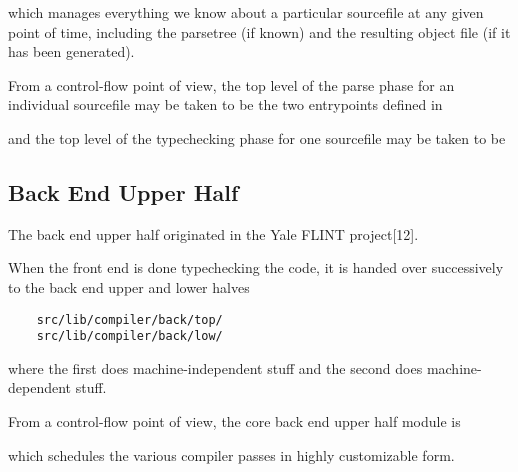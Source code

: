 which manages everything we know about a particular sourcefile 
at any given point of time, including the parsetree (if known) 
and the resulting object file (if it has been generated).


From a control-flow point of view, the top level of the parse 
phase for an individual sourcefile may be taken to be the two 
entrypoints defined in

\begin{quote}
\end{quote}

and the top level of the typechecking phase for one sourcefile 
may be taken to be

\begin{quote}
\end{quote}

\cutend*


\subsection{Back End Upper Half}
\label{section:compiler:backend-tophalf}

The back end upper half originated in the Yale {\sc FLINT} project[12].

When the front end is done typechecking the code, it 
is handed over successively to the back end upper and 
lower halves

\begin{verbatim}
    src/lib/compiler/back/top/
    src/lib/compiler/back/low/
\end{verbatim}

where the first  does machine-independent stuff 
and   the second does machine-dependent   stuff.

From a control-flow point of view, the core 
back end upper half module is

\begin{quote}
\end{quote}

which schedules the various compiler passes in 
highly customizable form.


